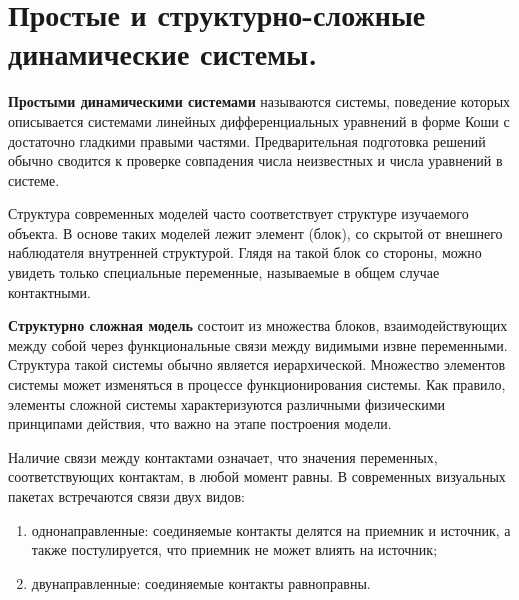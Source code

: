 \section{Простые и структурно-сложные динамические системы.}

\textbf{Простыми динамическими системами} называются системы, поведение
которых описывается системами линейных дифференциальных уравнений в форме
Коши с достаточно гладкими правыми частями. Предварительная подготовка
решений обычно сводится к проверке совпадения числа неизвестных и числа
уравнений в системе.

Структура современных моделей часто соответствует структуре изучаемого
объекта. В основе таких моделей лежит элемент (блок), со скрытой от внешнего
наблюдателя внутренней структурой. Глядя на такой блок со стороны, можно
увидеть только специальные переменные, называемые в общем случае
контактными.

\textbf{Структурно сложная модель} состоит из множества блоков,
взаимодействующих между собой через функциональные связи между видимыми
извне переменными. Структура такой системы обычно является иерархической.
Множество элементов системы может изменяться в процессе функционирования
системы. Как правило, элементы сложной системы характеризуются различными
физическими принципами действия, что важно на этапе построения модели.

Наличие связи между контактами означает, что значения переменных,
соответствующих контактам, в любой момент равны. В современных визуальных
пакетах встречаются связи двух видов:
\begin{enumerate}
  \item однонаправленные: соединяемые контакты делятся на приемник и
  источник, а также постулируется, что приемник не может влиять на источник;
  \item двунаправленные: соединяемые контакты равноправны.
\end{enumerate}

\clearpage
